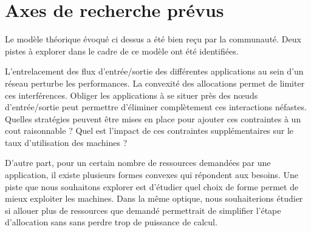 \documentclass[11pt,final,french]{article}	%
\begin{document}
\section{Axes de recherche prévus}

Le modèle théorique évoqué ci dessus a été bien reçu par la communauté.
%
Deux pistes à explorer dans le cadre de ce modèle ont été identifiées.

L'entrelacement des flux d'entrée/sortie des différentes applications au sein
d'un réseau perturbe les performances.
%
La convexité des allocations permet de limiter ces interférences.
%
Obliger les applications à se situer près des nœuds d'entrée/sortie peut
permettre d'éliminer complètement ces interactions néfastes.
%
Quelles stratégies peuvent être mises en place pour ajouter ces contraintes à
un cout raisonnable ?
%
Quel est l'impact de ces contraintes supplémentaires sur le taux d'utilisation
des machines ?

D'autre part, pour un certain nombre de ressources demandées par une
application, il existe plusieurs formes convexes qui répondent aux besoins.
%
Une piste que nous souhaitons explorer est d'étudier quel choix de forme permet
de mieux exploiter les machines.
%
Dans la même optique, nous souhaiterions étudier si allouer plus de ressources
que demandé permettrait de simplifier l'étape d'allocation sans sans perdre
trop de puissance de calcul.



\end{document}
